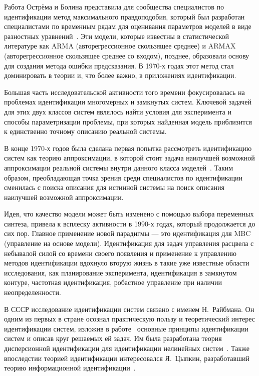 Работа Острёма и Болина представила для сообщества специалистов по идентификации метод
максимального правдоподобия, который был разработан специалистами по временным рядам для
оценивания параметров моделей в виде разностных уравнений~\cite{koopmans_1950}.
Эти модели, которые известны в статистической литературе как ARMA (авторегрессионное скользящее среднее) и
ARMAX (авторегрессионное скользящее среднее со входом), позднее,
образовали основу для создания метода ошибки предсказания.
В 1970-х годах этот метод стал доминировать в теории и, что более важно, в приложениях идентификации.

Большая часть исследовательской активности того времени фокусировалась на проблемах идентификации
многомерных и замкнутых систем.
Ключевой задачей для этих двух классов систем являлось найти условия для эксперимента и
способы параметризации проблемы, при которых найденная модель приблизится к единственно точному
описанию реальной системы.

В конце 1970-х годов была сделана первая попытка рассмотреть идентификацию систем как
теорию аппроксимации, в которой стоит задача наилучшей возможной аппроксимации реальной системы
внутри данного класса моделей~\cite{ljung_1976, anderson_1978, ljung_1979}.
Таким образом, преобладающая точка зрения среди специалистов по идентификации сменилась с
поиска описания для истинной системы на поиск описания наилучшей возможной аппроксимации.

Идея, что качество модели может быть изменено с помощью выбора переменных синтеза,
привела к всплеску активности в 1990-х годах, который продолжается до сих пор.
Главное применение новой парадигмы --- это идентификация для MBC (управление на основе модели).
Идентификация для задач управления расцвела с небывалой силой со времени своего появления и
применение к управлению методов идентификации вдохнуло вторую жизнь в такие уже
известные области исследования, как планирование эксперимента, идентификация в замкнутом контуре,
частотная идентификация, робастное управление при наличии неопределенности.

В СССР исследование идентификации систем связано с именем Н.~Райбмана.
Он одним из первых в стране осознал практическую пользу и теоретический интерес идентификации систем,
изложив в работе~\cite{raibman_1970} основные принципы идентификации систем и описав круг
решаемых ей задач.
Им была разработана теория дисперсионной идентификации для идентификации
нелинейных систем~\cite{raibman_1981}.
Также впоследстии теорией идентификации интересовался Я.~Цыпкин,
разработавший теорию информационной идентификации~\cite{tsypkin_1995}.

